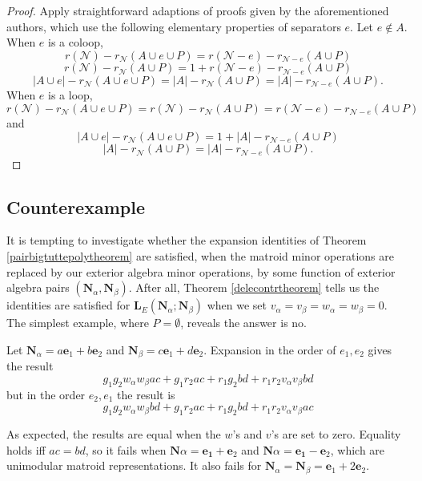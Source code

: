 \documentclass[Unicode]{cedram-alco}
\newcommand{\ext}[1]{\ensuremath{\mathbf{#1}}}
\begin{document}
\begin{proof}
  Apply straightforward adaptions of proofs given by the aforementioned
  authors, which use the following elementary properties of separators $e$.
  Let $e \not\in A$.  When $e$ is a coloop,
  \[
  r(\mathcal{N})-r_{\mathcal{N}}(A\cup e \cup P)
  =  r(\mathcal{N}-e)-r_{\mathcal{N}-e}(A \cup P)
  \]
  \[ r(\mathcal{N})-r_{\mathcal{N}}(A \cup P)
  =  1+r(\mathcal{N}-e)-r_{\mathcal{N}-e}(A \cup P)
  \]
  \[
  |A\cup e|-r_{\mathcal{N}}(A \cup e \cup P)
   =
   |A|-r_{\mathcal{N}}(A \cup P)
     =
     |A| - r_{\mathcal{N}-e}(A \cup P).
  \]
When $e$ is a loop,
  \[
  r(\mathcal{N})-r_{\mathcal{N}}(A\cup e \cup P)
  =  r(\mathcal{N})-r_{\mathcal{N}}(A \cup P)
  =   r(\mathcal{N}-e)-r_{\mathcal{N}-e}(A \cup P)
  \]
  and
  \[
  |A\cup e|-r_{\mathcal{N}}(A \cup e \cup P)
   =
   1+ |A|-r_{\mathcal{N}-e}(A \cup P)
   \]
   \[
    |A|-r_{\mathcal{N}}(A \cup P)
     =
     |A| - r_{\mathcal{N}-e}(A \cup P).
    \]
\end{proof}
  

\subsection{Counterexample}


It is tempting to investigate whether the expansion identities
of Theorem \ref{pairbigtuttepolytheorem} are satisfied, when the matroid
minor operations are replaced by our exterior algebra minor operations,
by some function of exterior algebra pairs $(\ext{N}_\alpha, \ext{N}_\beta)$.
After all, Theorem \ref{delecontrtheorem} tells us the identities are
satisfied for $\ext{L}_E(\ext{N}_\alpha;\ext{N}_\beta)$ when we set
$v_\alpha=v_\beta=w_\alpha=w_\beta=0$.  The simplest example, where $P=\emptyset$,
reveals the answer is no.

Let $\ext{N}_\alpha = a \ext{e}_1 + b \ext{e}_2$ and
$\ext{N}_\beta = c \ext{e}_1 + d \ext{e}_2$.  Expansion in the
order of $e_1, e_2$ gives the result
\[
g_1 g_2 w_\alpha w_\beta a c + g_1r_2 a c + r_1 g_2 b d + r_1 r_2 v_\alpha v_\beta b d
\]
but in the order $e_2, e_1$ the result is
\[
g_1 g_2 w_\alpha w_\beta b d + g_1r_2 a c + r_1 g_2 b d + r_1 r_2 v_\alpha v_\beta a c
\]

As expected, the results are equal when the $w$'s and $v$'s are set to zero.
Equality holds iff $ac=bd$, so it fails when
$\ext{N}\alpha = \ext{e_1} + \ext{e}_2$ and
$\ext{N}\alpha = \ext{e_1} - \ext{e}_2$, which are unimodular matroid representations.
It also fails for
$\ext{N}_\alpha = \ext{N}_\beta = \ext{e}_1 + 2\ext{e}_2$.
\end{document}
